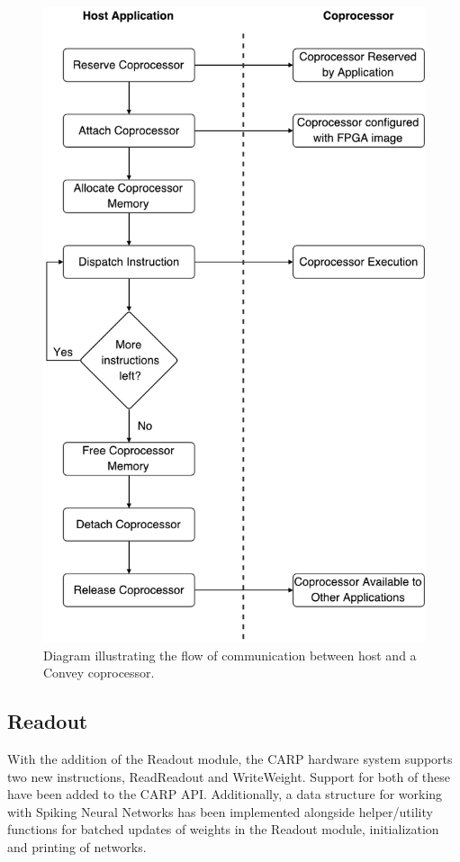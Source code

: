 \begin{figure}[ht]
  \centering
  \includegraphics[width=0.8\linewidth]{fig/convey-comm-flow}
  \caption{
    Diagram illustrating the flow of communication between host and a Convey
    coprocessor.
  }
  \label{fig:convey-comm-flow}
\end{figure}

\subsection{Readout}

With the addition of the Readout module, the CARP hardware system supports two
new instructions, ReadReadout and WriteWeight. Support for both of these have
been added to the CARP API. Additionally, a data structure for working
with Spiking Neural Networks has been implemented alongside helper/utility
functions for batched updates of weights in the Readout module, initialization
and printing of networks.

\cleardoublepage
